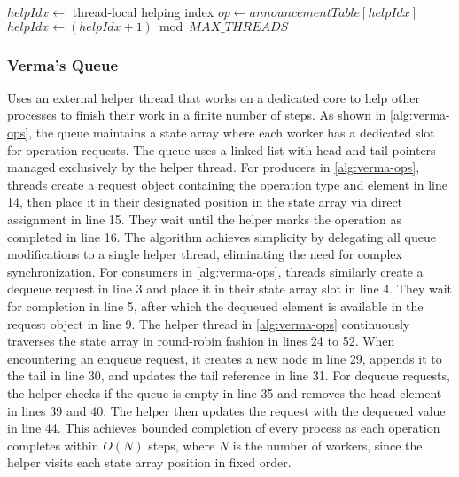 \begin{algorithm}[!ht]
\begin{algorithmic}[1]
        \State
        
            \State {}
            \State $helpIdx \gets $ thread-local helping index
            \State $op \gets announcementTable[helpIdx]$
                    \State {}
                \Else
                    \State {}
                \EndIf
            \EndIf
            \State $helpIdx \gets (helpIdx + 1) \bmod MAX\_THREADS$
        \EndFunction
    \end{algorithmic}
\end{algorithm}

\subsubsection{Verma's Queue} 
Uses an external helper thread that works on a dedicated core to help other processes to finish their work in a finite number of steps. As shown in \cref{alg:verma-ops}, the queue maintains a state array where each worker has a dedicated slot for operation requests. The queue uses a linked list with head and tail pointers managed exclusively by the helper thread. For producers in \cref{alg:verma-ops}, threads create a request object containing the operation type and element in line 14, then place it in their designated position in the state array via direct assignment in line 15. They wait until the helper marks the operation as completed in line 16. The algorithm achieves simplicity by delegating all queue modifications to a single helper thread, eliminating the need for complex synchronization. For consumers in \cref{alg:verma-ops}, threads similarly create a dequeue request in line 3 and place it in their state array slot in line 4. They wait for completion in line 5, after which the dequeued element is available in the request object in line 9. The helper thread in \cref{alg:verma-ops} continuously traverses the state array in round-robin fashion in lines 24 to 52. When encountering an enqueue request, it creates a new node in line 29, appends it to the tail in line 30, and updates the tail reference in line 31. For dequeue requests, the helper checks if the queue is empty in line 35 and removes the head element in lines 39 and 40. The helper then updates the request with the dequeued value in line 44. This achieves bounded completion of every process as each operation completes within $O(N)$ steps, where $N$ is the number of workers, since the helper visits each state array position in fixed order. \cite{Verma2013Scalable}

